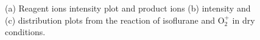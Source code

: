 \begin{figure}%
\centering
{}


\caption{(a) Reagent ions intensity plot and product ions  (b) intensity and (c) distribution plots from the reaction of isoflurane and O$_2^+$ in dry conditions.}
\label{fig:isof_o2}
\end{figure}

